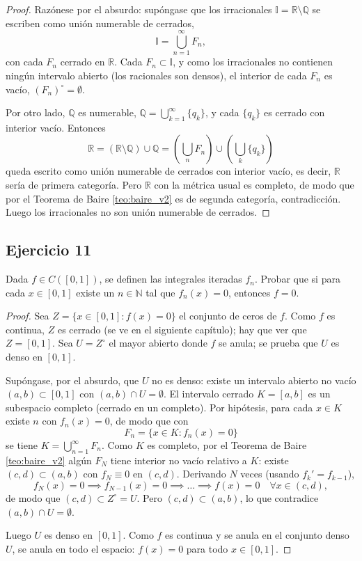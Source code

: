 \documentclass[11pt, a4paper]{article}
\begin{document}
\begin{proof}
Razónese por el absurdo: supóngase que los irracionales $\mathbb{I} = \mathbb{R} \setminus \mathbb{Q}$
se escriben como unión numerable de cerrados,
$$ \mathbb{I} = \bigcup_{n=1}^{\infty} F_n, $$
con cada $F_n$ cerrado en $\mathbb{R}$. Cada $F_n \subset \mathbb{I}$, y como los irracionales no
contienen ningún intervalo abierto (los racionales son densos), el interior de cada $F_n$ es vacío,
$(F_n)^\circ = \emptyset$.

Por otro lado, $\mathbb{Q}$ es numerable, $\mathbb{Q} = \bigcup_{k=1}^{\infty} \{q_k\}$, y cada
$\{q_k\}$ es cerrado con interior vacío. Entonces
$$ \mathbb{R} = (\mathbb{R} \setminus \mathbb{Q}) \cup \mathbb{Q}
= \left( \bigcup_{n} F_n \right) \cup \left( \bigcup_{k} \{q_k\} \right) $$
queda escrito como unión numerable de cerrados con interior vacío, es decir, $\mathbb{R}$ sería de
primera categoría. Pero $\mathbb{R}$ con la métrica usual es completo, de modo que por el Teorema de
Baire \ref{teo:baire_v2} es de segunda categoría, contradicción. Luego los irracionales no son unión
numerable de cerrados.
\end{proof}

\subsection*{Ejercicio 11}

Dada $f \in C([0,1])$, se definen las integrales iteradas $f_n$. Probar que si para cada
$x \in [0,1]$ existe un $n \in \mathbb{N}$ tal que $f_n(x)=0$, entonces $f=0$.

\begin{proof}
Sea $Z = \{ x \in [0, 1] : f(x) = 0 \}$ el conjunto de ceros de $f$. Como $f$ es continua, $Z$ es
cerrado (se ve en el siguiente capítulo); hay que ver que $Z = [0, 1]$. Sea $U = Z^\circ$ el mayor
abierto donde $f$ se anula; se prueba que $U$ es denso en $[0, 1]$.

Supóngase, por el absurdo, que $U$ no es denso: existe un intervalo abierto no vacío
$(a, b) \subset [0, 1]$ con $(a, b) \cap U = \emptyset$. El intervalo cerrado $K = [a, b]$ es un
subespacio completo (cerrado en un completo). Por hipótesis, para cada $x \in K$ existe $n$ con
$f_n(x) = 0$, de modo que con
$$ F_n = \{ x \in K : f_n(x) = 0 \} $$
se tiene $K = \bigcup_{n=1}^{\infty} F_n$. Como $K$ es completo, por el Teorema de Baire
\ref{teo:baire_v2} algún $F_N$ tiene interior no vacío relativo a $K$: existe $(c, d) \subset (a, b)$
con $f_N \equiv 0$ en $(c, d)$. Derivando $N$ veces (usando $f_k' = f_{k-1}$),
$$ f_N(x) = 0 \implies f_{N-1}(x) = 0 \implies \dots \implies f(x) = 0 \quad \forall x \in (c, d), $$
de modo que $(c, d) \subset Z^\circ = U$. Pero $(c, d) \subset (a, b)$, lo que contradice
$(a, b) \cap U = \emptyset$.

Luego $U$ es denso en $[0, 1]$. Como $f$ es continua y se anula en el conjunto denso $U$, se anula en
todo el espacio: $f(x) = 0$ para todo $x \in [0, 1]$.
\end{proof}
\end{document}
